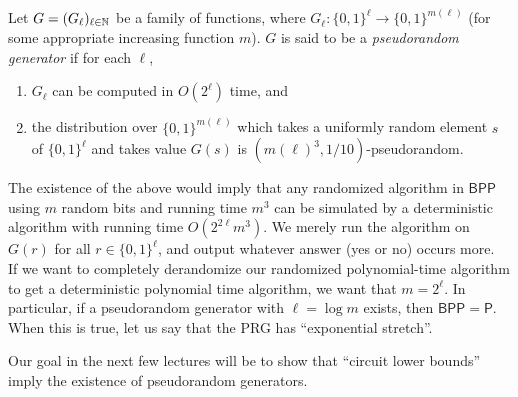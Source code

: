 		\begin{fdef}
			Let $G = (G_\ell)_{\ell \in \mathbb{N}}$ be a family of functions, where $G_\ell : \{0,1\}^{\ell} \to \{0,1\}^{m(\ell)}$ (for some appropriate increasing function $m$). $G$ is said to be a \emph{pseudorandom generator} if for each $\ell$,
			\begin{enumerate}[label=(\alph*)]
				\item $G_\ell$ can be computed in $O(2^\ell)$ time, and
				\item the distribution over $\{0,1\}^{m(\ell)}$ which takes a uniformly random element $s$ of $\{0,1\}^\ell$ and takes value $G(s)$ is $(m(\ell)^3 , 1/10)$-pseudorandom.
			\end{enumerate}
		\end{fdef}
		The existence of the above would imply that any randomized algorithm in $\mathsf{BPP}$ using $m$  random bits and running time $m^3$ can be simulated by a deterministic algorithm with running time $O(2^{2\ell}m^3)$. We merely run the algorithm on $G(r)$ for all $r \in \{0,1\}^\ell$, and output whatever answer (\textsf{yes} or \textsf{no}) occurs more. \\
		If we want to completely derandomize our randomized polynomial-time algorithm to get a deterministic polynomial time algorithm, we want that $m = 2^\ell$. In particular, if a pseudorandom generator with $\ell = \log m$ exists, then $\mathsf{BPP} = \mathsf{P}$. When this is true, let us say that the PRG has ``exponential stretch''. %

		Our goal in the next few lectures will be to show that ``circuit lower bounds'' imply the existence of pseudorandom generators.

